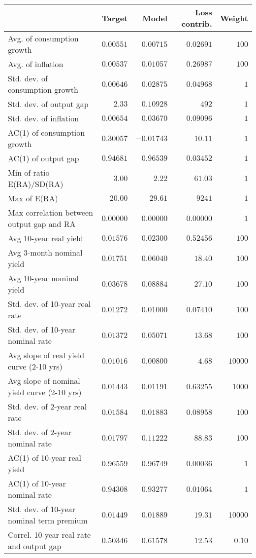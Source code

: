 \begin{tabular}{lrrrr} \hline  & Target & Model & Loss contrib. & Weight \\ \hline Avg. of consumption growth & $0.00551$ & $0.00715$ & $0.02691$ & $100$ \\ Avg. of inflation & $0.00537$ & $0.01057$ & $0.26987$ & $100$ \\ Std. dev. of consumption growth & $0.00646$ & $0.02875$ & $0.04968$ & $1$ \\ Std. dev. of output gap & $2.33$ & $0.10928$ & $492$ & $1$ \\ Std. dev. of inflation & $0.00654$ & $0.03670$ & $0.09096$ & $1$ \\ AC(1) of consumption growth & $0.30057$ & $-0.01743$ & $10.11$ & $1$ \\ AC(1) of output gap & $0.94681$ & $0.96539$ & $0.03452$ & $1$ \\ Min of ratio E(RA)/SD(RA) & $3.00$ & $2.22$ & $61.03$ & $1$ \\ Max of E(RA) & $20.00$ & $29.61$ & $9241$ & $1$ \\ Max correlation between output gap and RA & $0.00000$ & $0.00000$ & $0.00000$ & $1$ \\ Avg 10-year real yield & $0.01576$ & $0.02300$ & $0.52456$ & $100$ \\ Avg 3-month nominal yield & $0.01751$ & $0.06040$ & $18.40$ & $100$ \\ Avg 10-year nominal yield & $0.03678$ & $0.08884$ & $27.10$ & $100$ \\ Std. dev. of 10-year real rate & $0.01272$ & $0.01000$ & $0.07410$ & $100$ \\ Std. dev. of 10-year nominal rate & $0.01372$ & $0.05071$ & $13.68$ & $100$ \\ Avg slope of real yield curve (2-10 yrs) & $0.01016$ & $0.00800$ & $4.68$ & $10000$ \\ Avg slope of nominal yield curve (2-10 yrs) & $0.01443$ & $0.01191$ & $0.63255$ & $1000$ \\ Std. dev. of 2-year real rate & $0.01584$ & $0.01883$ & $0.08958$ & $100$ \\ Std. dev. of 2-year nominal rate & $0.01797$ & $0.11222$ & $88.83$ & $100$ \\ AC(1) of 10-year real yield & $0.96559$ & $0.96749$ & $0.00036$ & $1$ \\ AC(1) of 10-year nominal rate & $0.94308$ & $0.93277$ & $0.01064$ & $1$ \\ Std. dev. of 10-year nominal term premium & $0.01449$ & $0.01889$ & $19.31$ & $10000$ \\ Correl. 10-year real rate and output gap & $0.50346$ & $-0.61578$ & $12.53$ & $0.10$ \\ \hline \end{tabular}